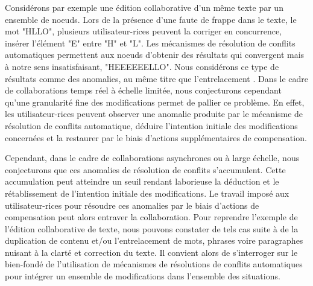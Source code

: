 Considérons par exemple une édition collaborative d'un même texte par un ensemble de noeuds.
Lors de la présence d'une faute de frappe dans le texte, \eg le mot "HLLO", plusieurs utilisateur-rices peuvent la corriger en concurrence, \ie insérer l'élément "E" entre "H" et "L".
Les mécanismes de résolution de conflits automatiques permettent aux noeuds d'obtenir des résultats qui convergent mais à notre sens insatisfaisant, \eg "HEEEEEELLO".
Nous considérons ce type de résultats comme des anomalies, au même titre que l'entrelacement \cite{2019-interleaving-anomalies-collaborative-editors-kleppmann}.
Dans le cadre de collaborations temps réel à échelle limitée, nous conjecturons cependant qu'une granularité fine des modifications permet de pallier ce problème.
En effet, les utilisateur-rices peuvent observer une anomalie produite par le mécanisme de résolution de conflits automatique, déduire l'intention initiale des modifications concernées et la restaurer par le biais d'actions supplémentaires de compensation.

Cependant, dans le cadre de collaborations asynchrones ou à large échelle, nous conjecturons que ces anomalies de résolution de conflits s'accumulent.
Cette accumulation peut atteindre un seuil rendant laborieuse la déduction et le rétablissement de l'intention initiale des modifications.
Le travail imposé aux utilisateur-rices pour résoudre ces anomalies par le biais d'actions de compensation peut alors entraver la collaboration.
Pour reprendre l'exemple de l'édition collaborative de texte, nous pouvons constater de tels cas suite à de la duplication de contenu et/ou l'entrelacement de mots, phrases voire paragraphes nuisant à la clarté et correction du texte.
Il convient alors de s'interroger sur le bien-fondé de l'utilisation de mécanismes de résolutions de conflits automatiques pour intégrer un ensemble de modifications dans l'ensemble des situations.

